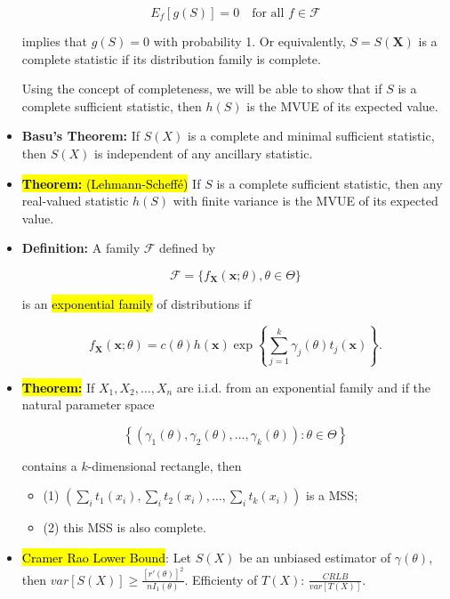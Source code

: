 \documentclass[a4paper,10pt]{article}
\begin{document}
\begin{multicols}{2}
\begin{itemize}
    \[
    E_f[g(S)] = 0 \quad \text{for all } f \in \mathcal{F}
    \]
    
    implies that \( g(S) = 0 \) with probability 1. Or equivalently, \( S = S(\mathbf{X}) \) is a complete statistic if its distribution family is complete.
    
    Using the concept of completeness, we will be able to show that if \( S \) is a complete sufficient statistic, then \( h(S) \) is the MVUE of its expected value.
    \item \textbf{Basu's Theorem:} If \( S(X) \) is a complete and minimal sufficient statistic, then \( S(X) \) is independent of any ancillary statistic.

    \item \hl{\textbf{Theorem:} (Lehmann-Scheffé)} If \( S \) is a complete sufficient statistic, then any real-valued statistic \( h(S) \) with finite variance is the MVUE of its expected value.

    \item \textbf{Definition:} A family \( \mathcal{F} \) defined by

    \[
    \mathcal{F} = \{ f_{\mathbf{X}}(\mathbf{x}; \theta), \theta \in \Theta \}
    \]
    
    is an \hl{exponential family} of distributions if
    
    \[
    f_{\mathbf{X}}(\mathbf{x}; \theta) = c(\theta) h(\mathbf{x}) \exp \left\{ \sum_{j=1}^{k} \gamma_j(\theta) t_j(\mathbf{x}) \right\}.
    \]

    \item \hl{\textbf{Theorem:}} If \( X_1, X_2, \dots, X_n \) are i.i.d. from an exponential family and if the natural parameter space

    \[
    \left\{ (\gamma_1(\theta), \gamma_2(\theta), \dots, \gamma_k(\theta)) : \theta \in \Theta \right\}
    \]
    
    contains a \( k \)-dimensional rectangle, then
    
    \begin{itemize}
        \item (1) \( \left(\sum_i t_1(x_i), \sum_i t_2(x_i), \dots, \sum_i t_k(x_i) \right) \) is a MSS;
        \item (2) this MSS is also complete.
    \end{itemize}

    \item \hl{Cramer Rao Lower Bound}: Let $S(X)$ be an unbiased estimator of $\gamma (\theta)$, then $var[S(X)]\ge \frac{[r'(\theta)]^2}{nI_1(\theta)}$. Efficienty of $T(X)$: $\frac{CRLB}{var[T(X)]}$.




\end{itemize}

\end{multicols}
\end{document}
